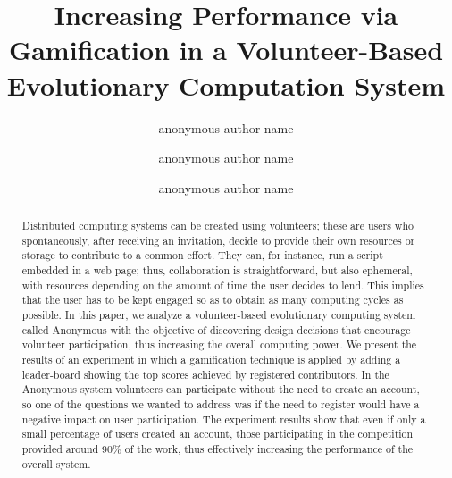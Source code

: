 \documentclass{llncs}
\begin{document}
\sloppy

\title{Increasing Performance via Gamification in a Volunteer-Based Evolutionary Computation System}


\author{anonymous author name  \and anonymous author name \and  anonymous author name }







\maketitle


\begin{abstract}

Distributed computing systems can be created using volunteers; these
are users who spontaneously, after receiving an invitation, decide to
provide their own resources or storage to contribute to a common
effort. They can, for instance, run a script embedded in a web page;
thus, 
collaboration is straightforward, but also ephemeral, with resources
depending on the amount of time the user decides to lend. This  implies that 
the user has to be kept engaged so as to obtain as many computing cycles as
possible. In this paper, we analyze a volunteer-based evolutionary computing system called
Anonymous with the objective of discovering design decisions that encourage volunteer
participation, thus increasing the overall computing power. We present the results of
an experiment in which a gamification technique is applied by adding a leader-board
showing the top scores achieved by registered contributors. In the
Anonymous system volunteers can
participate without the need to create an account, so one of the
questions we wanted to address was
if the need to register would have a negative impact on user participation.
The experiment results show that even if only a small percentage of users created an account,
those participating in the competition provided around 90\% of the
work, thus effectively increasing the performance of the overall
system. 

\end{abstract}
\end{document}
